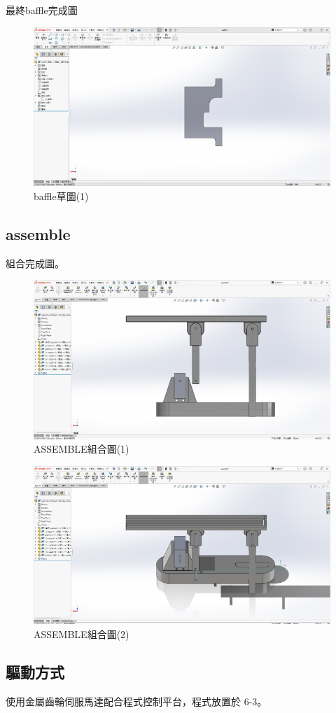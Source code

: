 最終baffle完成圖

\begin{figure}[htbp]
    \centering
    \includegraphics[width=1\textwidth]{./../images/螢幕擷取畫面 2024-05-25 230234}
    \caption{baffle草圖(1)}
\end{figure}

\subsection{assemble}

組合完成圖。

\begin{figure}[htbp]
    \centering
    \includegraphics[width=1\textwidth]{./../images/6-1-45}
    \caption{ASSEMBLE組合圖(1)}
\end{figure}

\begin{figure}[htbp]
    \centering
    \includegraphics[width=1\textwidth]{./../images/6-1-46}
    \caption{ASSEMBLE組合圖(2)}
\end{figure}


\subsection{驅動方式}

使用金屬齒輪伺服馬達配合程式控制平台，程式放置於 6-3。

